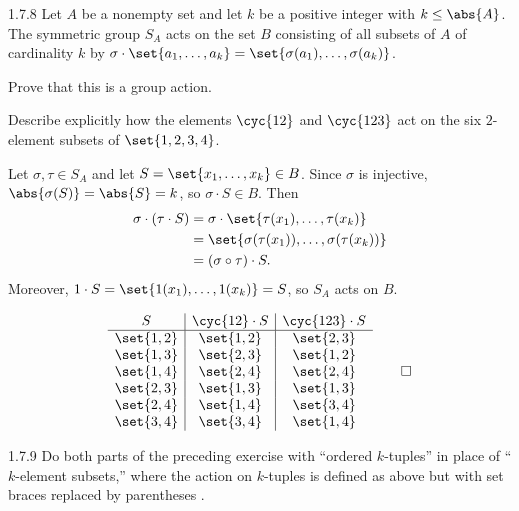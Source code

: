 \begin{exercise}{1.7.8}
    Let $A$ be a nonempty set and let $k$ be a positive integer with $k \leq \abs{A}$.
	The symmetric group $S_A$ acts on the set $B$ consisting of all subsets of $A$ of cardinality $k$ by $\sigma \cdot \set{a_1, \ldots, a_k} = \set{\sigma(a_1), \ldots, \sigma(a_k)}$.
    \begin{subexercises}
        \item Prove that this is a group action.
        \item Describe explicitly how the elements $\cyc{1 2}$ and $\cyc{1 2 3}$ act on the six $2$-element subsets of $\set{1,2,3,4}$.
    \end{subexercises}
\end{exercise}

\begin{solenum}
    \item Let $\sigma, \tau \in S_A$ and let $S = \set{x_1, \ldots, x_k} \in B$.
    Since $\sigma$ is injective, $\abs{\sigma(S)} = \abs{S} = k$, so $\sigma \cdot S \in B$.
	Then
    \begin{align*}
        \sigma \cdot (\tau \cdot S) & = \sigma \cdot \set{\tau(x_1), \ldots, \tau(x_k)} \\
        & = \set{\sigma(\tau(x_1)), \ldots, \sigma(\tau(x_k))} \\
        & = (\sigma \circ \tau) \cdot S.
    \end{align*}
    Moreover, $1 \cdot S = \set{1(x_1), \ldots, 1(x_k)} = S$, so $S_A$ acts on $B$.
    \item
    \[
        \begin{array}{*{2}{c|}c}
            S & \cyc{1 2} \cdot S & \cyc{1 2 3} \cdot S \\
            \hline
            \set{1, 2} & \set{1, 2} & \set{2, 3} \\
            \set{1, 3} & \set{2, 3} & \set{1, 2} \\
            \set{1, 4} & \set{2, 4} & \set{2, 4} \\
            \set{2, 3} & \set{1, 3} & \set{1, 3} \\
            \set{2, 4} & \set{1, 4} & \set{3, 4} \\
            \set{3, 4} & \set{3, 4} & \set{1, 4}
        \end{array} \qedhere
    \]
\end{solenum}

\begin{exercise}{1.7.9}
    Do both parts of the preceding exercise with ``ordered $k$-tuples'' in place of ``$k$-element subsets,'' where the action on $k$-tuples is defined as above but with set braces replaced by parentheses
    .

\end{exercise}

